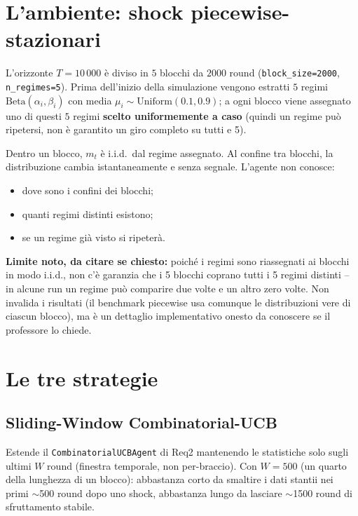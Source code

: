 \documentclass[11pt]{article}
\begin{document}
\section{L'ambiente: shock piecewise-stazionari}

L'orizzonte $T=10\,000$ è diviso in $5$ blocchi da $2000$ round (\texttt{block\_size=2000}, \texttt{n\_regimes=5}). Prima dell'inizio della simulazione vengono estratti $5$ regimi $\text{Beta}(\alpha_i,\beta_i)$ con media $\mu_i \sim \text{Uniform}(0.1, 0.9)$; a ogni blocco viene assegnato uno di questi $5$ regimi \textbf{scelto uniformemente a caso} (quindi un regime può ripetersi, non è garantito un giro completo su tutti e 5).

Dentro un blocco, $m_t$ è i.i.d.\ dal regime assegnato. Al confine tra blocchi, la distribuzione cambia istantaneamente e senza segnale. L'agente non conosce:
\begin{itemize}
\item dove sono i confini dei blocchi;
\item quanti regimi distinti esistono;
\item se un regime già visto si ripeterà.
\end{itemize}

\begin{flagbox}
\textbf{Limite noto, da citare se chiesto:} poiché i regimi sono riassegnati ai blocchi in modo i.i.d., non c'è garanzia che i 5 blocchi coprano tutti i 5 regimi distinti -- in alcune run un regime può comparire due volte e un altro zero volte. Non invalida i risultati (il benchmark piecewise usa comunque le distribuzioni vere di ciascun blocco), ma è un dettaglio implementativo onesto da conoscere se il professore lo chiede.
\end{flagbox}

\section{Le tre strategie}

\subsection{Sliding-Window Combinatorial-UCB}
Estende il \texttt{CombinatorialUCBAgent} di Req2 mantenendo le statistiche solo sugli ultimi $W$ round (finestra temporale, non per-braccio). Con $W=500$ (un quarto della lunghezza di un blocco): abbastanza corto da smaltire i dati stantii nei primi $\sim$500 round dopo uno shock, abbastanza lungo da lasciare $\sim$1500 round di sfruttamento stabile.
\end{document}
